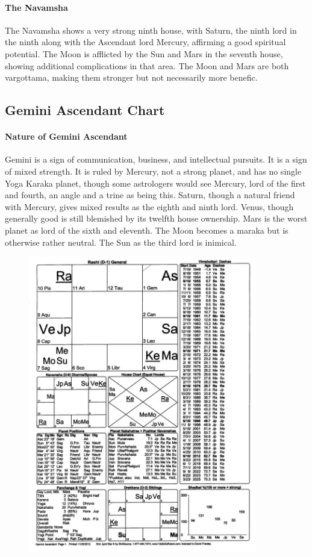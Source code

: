  

\paragraph{The Navamsha}

 

The Navamsha shows a very strong ninth house, with Saturn, the ninth lord in the ninth along with the Ascendant lord Mercury, affirming a good spiritual potential. The Moon is afflicted by the Sun and Mars in the seventh house, showing additional complications in that area. The Moon and Mars are both vargottama, making them stronger but not necessarily more benefic.

 

\subsection{Gemini Ascendant Chart}
 

\paragraph{Nature of Gemini Ascendant}

 

Gemini is a sign of communication, business, and intellectual pursuits. It is a sign of mixed strength. It is ruled by Mercury, not a strong planet, and has no single Yoga Karaka planet, though some astrologers would see Mercury, lord of the first and fourth, an angle and a trine as being this. Saturn, though a natural friend with Mercury, gives mixed results as the eighth and ninth lord. Venus, though generally good is still blemished by its twelfth house ownership. Mars is the worst planet as lord of the sixth and eleventh. The Moon becomes a maraka but is otherwise rather neutral. The Sun as the third lord is inimical.

 
\begin{figure}[h]
\centering
\includegraphics[width=10cm]{pics/Gemini-Ascendant.jpg}
\caption{}
\end{figure}


